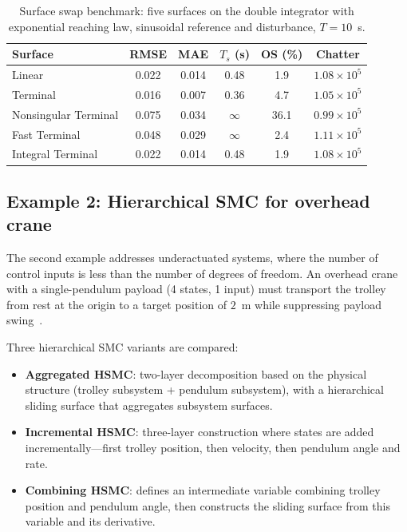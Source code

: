 \documentclass[preprint,12pt]{elsarticle}
\begin{document}
\begin{table}[t]
\centering
\small
\caption{Surface swap benchmark: five surfaces on the double integrator with exponential reaching law, sinusoidal reference and disturbance, $T=10$~s.}
\label{tab:surface_swap}
\begin{tabular}{lccccc}
\toprule
\textbf{Surface} & \textbf{RMSE} & \textbf{MAE} & \textbf{$T_s$ (s)} & \textbf{OS (\%)} & \textbf{Chatter} \\
\midrule
Linear              & 0.022 & 0.014 & 0.48 &  1.9 & $1.08 \times 10^5$ \\
Terminal            & 0.016 & 0.007 & 0.36 &  4.7 & $1.05 \times 10^5$ \\
Nonsingular Terminal & 0.075 & 0.034 & $\infty$ & 36.1 & $0.99 \times 10^5$ \\
Fast Terminal       & 0.048 & 0.029 & $\infty$ &  2.4 & $1.11 \times 10^5$ \\
Integral Terminal   & 0.022 & 0.014 & 0.48 &  1.9 & $1.08 \times 10^5$ \\
\bottomrule
\end{tabular}
\end{table}

\subsection{Example 2: Hierarchical SMC for overhead crane}
\label{sec:ex2}

The second example addresses underactuated systems, where the number of control inputs is less than the number of degrees of freedom. An overhead crane with a single-pendulum payload (4 states, 1 input) must transport the trolley from rest at the origin to a target position of $2$~m while suppressing payload swing~\cite{qian2015hierarchical}.

Three hierarchical SMC variants are compared:
\begin{itemize}
    \item \textbf{Aggregated HSMC}: two-layer decomposition based on the physical structure (trolley subsystem + pendulum subsystem), with a hierarchical sliding surface that aggregates subsystem surfaces.
    \item \textbf{Incremental HSMC}: three-layer construction where states are added incrementally---first trolley position, then velocity, then pendulum angle and rate.
    \item \textbf{Combining HSMC}: defines an intermediate variable combining trolley position and pendulum angle, then constructs the sliding surface from this variable and its derivative.
\end{itemize}
\end{document}
